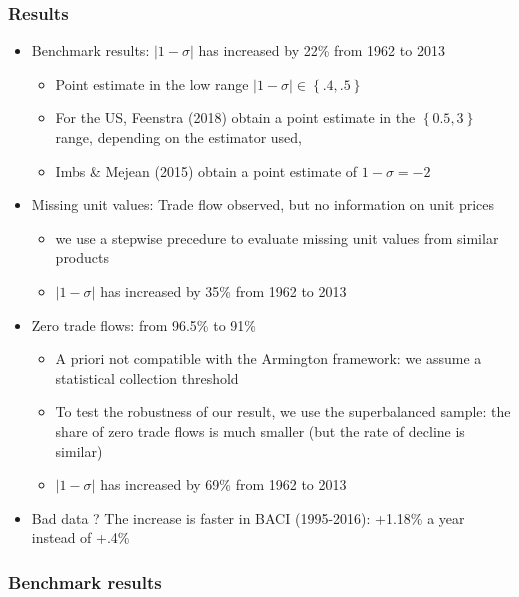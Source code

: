 \documentclass{beamer}
\begin{document}
\begin{frame}[plain]\frametitle{Results}
\begin{itemize}
	\item Benchmark results: $|1-\sigma|$ has increased by 22\% from 1962 to 2013
	\begin{itemize}
		\item Point estimate in the low range $|1-\sigma|\in\left\{.4,.5\right\}$
		\item For the US, Feenstra (2018) obtain a point estimate in the $\left\{0.5,3\right\}$ range, depending on the estimator used,
		\item Imbs \& Mejean (2015) obtain a point estimate of $1-\sigma=-2$
	\end{itemize}
	\item Missing unit values: Trade flow observed, but no information on unit prices 
	\begin{itemize}
		\item we use a stepwise precedure to evaluate missing unit values from similar products
		\item $|1-\sigma|$ has increased by 35\% from 1962 to 2013
	\end{itemize}
	\item Zero trade flows: from 96.5\% to 91\%
	\begin{itemize}
		\item A priori not compatible with the Armington framework: we assume a statistical collection threshold
		\item To test the robustness of our result, we use the superbalanced sample: the share of zero trade flows is much smaller (but the rate of decline is similar)
		\item $|1-\sigma|$ has increased by 69\% from 1962 to 2013
	\end{itemize}
	\item Bad data ? The increase is faster in BACI (1995-2016): +1.18\% a year instead of +.4\%
\end{itemize}
\end{frame}


\begin{frame}[plain]\frametitle{Benchmark results}
	\begin{figure}[h!]
		\begin{center}
			\setlength{\fboxrule}{1pt} %
			\setlength{\fboxsep}{.1in} %
		\end{center}
	\end{figure}
\end{frame}
\end{document}
